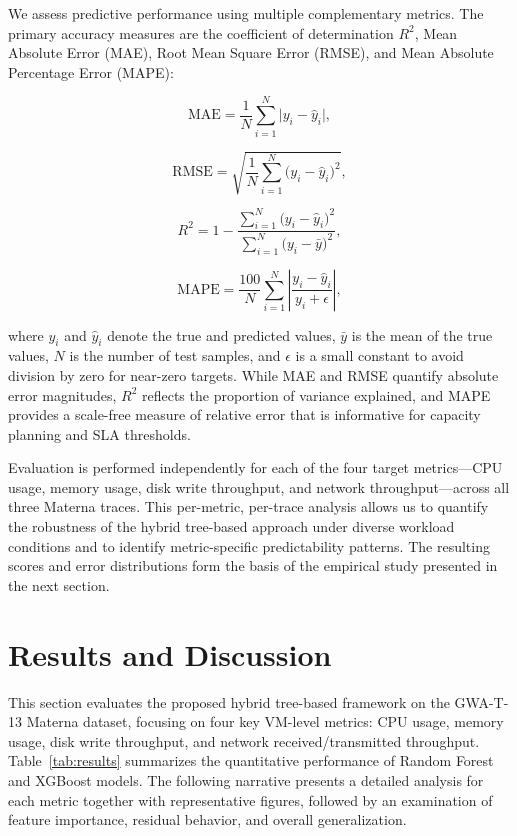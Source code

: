 \documentclass[a4paper,fleqn]{cas-dc}
\begin{document}
We assess predictive performance using multiple complementary metrics. The primary accuracy measures are the coefficient of determination $R^2$, Mean Absolute Error (MAE), Root Mean Square Error (RMSE), and Mean Absolute Percentage Error (MAPE):

\begin{equation}
\text{MAE} = \frac{1}{N} \sum_{i=1}^{N} \big|y_i - \hat{y}_i\big|,
\end{equation}

\begin{equation}
\text{RMSE} = \sqrt{\frac{1}{N} \sum_{i=1}^{N} \big(y_i - \hat{y}_i\big)^2},
\end{equation}

\begin{equation}
R^2 = 1 - \frac{\sum_{i=1}^{N} \big(y_i - \hat{y}_i\big)^2}{\sum_{i=1}^{N} \big(y_i - \bar{y}\big)^2},
\end{equation}

\begin{equation}
\text{MAPE} = \frac{100}{N} \sum_{i=1}^{N} \left|\frac{y_i - \hat{y}_i}{y_i + \epsilon}\right|,
\end{equation}

where $y_i$ and $\hat{y}_i$ denote the true and predicted values, $\bar{y}$ is the mean of the true values, $N$ is the number of test samples, and $\epsilon$ is a small constant to avoid division by zero for near-zero targets. While MAE and RMSE quantify absolute error magnitudes, $R^2$ reflects the proportion of variance explained, and MAPE provides a scale-free measure of relative error that is informative for capacity planning and SLA thresholds.

Evaluation is performed independently for each of the four target metrics---CPU usage, memory usage, disk write throughput, and network throughput---across all three Materna traces. This per-metric, per-trace analysis allows us to quantify the robustness of the hybrid tree-based approach under diverse workload conditions and to identify metric-specific predictability patterns. The resulting scores and error distributions form the basis of the empirical study presented in the next section.

\section{Results and Discussion}
\label{sec:results}

This section evaluates the proposed hybrid tree-based framework on the GWA-T-13 Materna dataset, focusing on four key VM-level metrics: CPU usage, memory usage, disk write throughput, and network received/transmitted throughput. Table~\ref{tab:results} summarizes the quantitative performance of Random Forest and XGBoost models. The following narrative presents a detailed analysis for each metric together with representative figures, followed by an examination of feature importance, residual behavior, and overall generalization.
\end{document}
